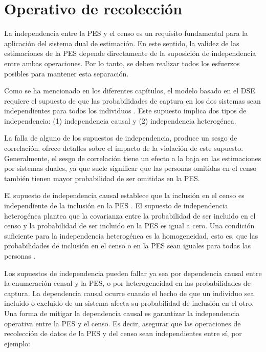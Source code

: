 \documentclass[
  12pt,
]{book}
\begin{document}
\section{Operativo de recolección}\label{operativo-de-recolecciuxf3n}

La independencia entre la PES y el censo es un requisito fundamental para la aplicación del sistema dual de estimación. En este sentido, la validez de las estimaciones de la PES depende directamente de la suposición de independencia entre ambas operaciones. Por lo tanto, se deben realizar todos los esfuerzos posibles para mantener esta separación.

Como se ha mencionado en los diferentes capítulos, el modelo basado en el DSE requiere el supuesto de que las probabilidades de captura en los dos sistemas sean independientes para todos los individuos \citep{wolter1986coverage}. Este supuesto implica dos tipos de independencia: (1) independencia causal y (2) independencia heterogénea.

La falla de alguno de los supuestos de independencia, produce un sesgo de correlación. \citep{griffin2000correlationbias} ofrece detalles sobre el impacto de la violación de este supuesto. Generalmente, el sesgo de correlación tiene un efecto a la baja en las estimaciones por sistemas duales, ya que suele significar que las personas omitidas en el censo también tienen mayor probabilidad de ser omitidas en la PES.

El supuesto de independencia causal establece que la inclusión en el censo es independiente de la inclusión en la PES \citep{wolter1986coverage}. El supuesto de independencia heterogénea plantea que la covarianza entre la probabilidad de ser incluido en el censo y la probabilidad de ser incluido en la PES es igual a cero. Una condición suficiente para la independencia heterogénea es la homogeneidad, esto es, que las probabilidades de inclusión en el censo o en la PES sean iguales para todas las personas \citep{mulry1991total}.

Los supuestos de independencia pueden fallar ya sea por dependencia causal entre la enumeración censal y la PES, o por heterogeneidad en las probabilidades de captura. La dependencia causal ocurre cuando el hecho de que un individuo sea incluido o excluido de un sistema afecta su probabilidad de inclusión en el otro. Una forma de mitigar la dependencia causal es garantizar la independencia operativa entre la PES y el censo. Es decir, asegurar que las operaciones de recolección de datos de la PES y del censo sean independientes entre sí, por ejemplo:
\end{document}
